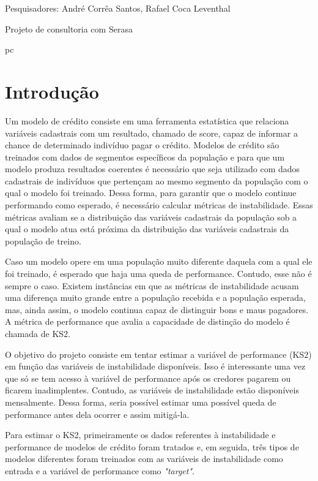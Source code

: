     {
        \noindent Pesquisadores: André Corrêa Santos, Rafael Coca Leventhal

        \noindent Projeto de consultoria com Serasa
    }
    {\lipsum[1-1]}
    {pc}

\section{Introdução}
    Um modelo de crédito consiste em uma ferramenta estatística que relaciona variáveis cadastrais com um resultado, chamado de score, capaz de informar a chance de determinado indivíduo pagar o crédito.
    Modelos de crédito são treinados com dados de segmentos específicos da população e para que um modelo produza resultados coerentes é necessário que seja utilizado com dados cadastrais de indivíduos que pertençam ao mesmo segmento da população com o qual o modelo foi treinado. Dessa forma, para garantir que o modelo continue performando como esperado, é necessário calcular métricas de instabilidade. Essas métricas avaliam se a distribuição das variáveis cadastrais da população sob a qual o modelo atua está próxima da distribuição das variáveis cadastrais da população de treino.

    Caso um modelo opere em uma população muito diferente daquela com a qual ele foi treinado, é esperado que haja uma queda de performance. Contudo, esse não é sempre o caso. Existem instâncias em que as métricas de instabilidade acusam uma diferença muito grande entre a população recebida e a população esperada, mas, ainda assim, o modelo continua capaz de distinguir bons e maus pagadores. A métrica de performance que avalia a capacidade de distinção do modelo é chamada de KS2.
    
    O objetivo do projeto consiste em tentar estimar a variável de performance (KS2) em função das variáveis de instabilidade disponíveis. Isso é interessante uma vez que só se tem acesso à variável de performance após os credores pagarem ou ficarem inadimplentes. Contudo, as variáveis de instabilidade estão disponíveis mensalmente. Dessa forma, seria possível estimar uma possível queda de performance antes dela ocorrer e assim mitigá-la.

    Para estimar o KS2, primeiramente os dados referentes à instabilidade e performance de modelos de crédito foram tratados e, em seguida, três tipos de modelos diferentes foram treinados com as variáveis de instabilidade como entrada e a variável de performance como \emph{"target"}.
    
